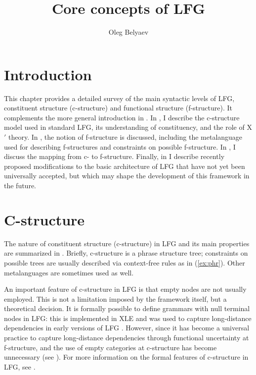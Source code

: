 \documentclass[output=paper,hidelinks]{langscibook}
\title{Core concepts of LFG}
\author{Oleg Belyaev\affiliation{Lomonosov Moscow State University, Institute of Linguistics of the Russian Academy of Sciences, and Pushkin State Russian Language Institute}}
\begin{document}
\maketitle
\label{chap:CoreConcepts}

\nocite{chapters/GFs,chapters/Intro}
 \section{Introduction}
 
 This chapter provides a detailed survey of the main syntactic levels of LFG, constituent structure (c-structure) and functional structure (f-structure). It complements the more general introduction in . In , I describe the c-structure model used in standard LFG, its understanding of constituency, and the role of X$'$ theory. In , the notion of f-structure is discussed, including the metalanguage used for describing f-structures and constraints on possible f-structure. In , I discuss the mapping from c- to f-structure. Finally, in  I describe recently proposed modifications to the basic architecture of LFG that have not yet been universally accepted, but which may shape the development of this framework in the future.
 
 \section{C-structure\label{sect:c-structure}}
 
 The nature of constituent structure (c-structure) in LFG and its main properties are summarized in . Briefly, c-structure is a phrase structure tree; constraints on possible trees are usually described via context-free rules as in (\ref{ex:phr}). Other metalanguages are sometimes used as well.
 
 \ea\label{ex:phr}
 \z
 
\noindent An important feature of c-structure in LFG is that empty nodes are not usually employed. This is not a limitation imposed by the framework itself, but a theoretical decision. It is formally possible to define grammars with null terminal nodes in LFG: this is implemented in XLE \citep{xledoc} and was used to capture long-distance dependencies in early versions of LFG \citep{kaplanbresnan82}. However, since \citet{kaplzaen89} it has become a universal practice to capture long-distance dependencies through functional uncertainty at f-structure, and the use of empty categories at c-structure has become unnecessary (see ). For more information on the formal features of c-structure in LFG, see .
\end{document}
